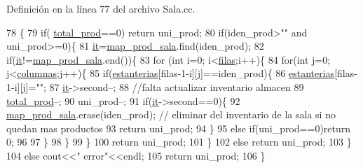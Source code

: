 Definición en la línea 77 del archivo Sala.\+cc.


\begin{DoxyCode}
78 \{
79     \textcolor{keywordflow}{if}( \hyperlink{class_sala_aeb64df257f47ad63fe1ba3b163255e14}{total\_prod}==0) \textcolor{keywordflow}{return} uni\_prod;
80     \textcolor{keywordflow}{if}(iden\_prod>\textcolor{stringliteral}{""} and uni\_prod>=0)\{
81         \hyperlink{class_sala_a1cc789ab041a9e3011f9eec9357e8fb0}{it}=\hyperlink{class_sala_a1ee09851cf1735dc48ab69a91952e250}{map\_prod\_sala}.find(iden\_prod);
82         \textcolor{keywordflow}{if}(\hyperlink{class_sala_a1cc789ab041a9e3011f9eec9357e8fb0}{it}!=\hyperlink{class_sala_a1ee09851cf1735dc48ab69a91952e250}{map\_prod\_sala}.end())\{
83             \textcolor{keywordflow}{for} (\textcolor{keywordtype}{int} i=0; i<\hyperlink{class_sala_a4cccb03763eea3ebd6d192491b25f7dc}{filas};i++)\{
84                 \textcolor{keywordflow}{for}(\textcolor{keywordtype}{int} j=0; j<\hyperlink{class_sala_af3c278931f26e28e77fa363e9be82000}{columnas};j++)\{
85                     \textcolor{keywordflow}{if}(\hyperlink{class_sala_a88aae17b7e590770fe8115b41da2e26a}{estanterias}[filas-1-i][j]==iden\_prod)\{
86                         \hyperlink{class_sala_a88aae17b7e590770fe8115b41da2e26a}{estanterias}[filas-1-i][j]=\textcolor{stringliteral}{""};
87                         \hyperlink{class_sala_a1cc789ab041a9e3011f9eec9357e8fb0}{it}->second--;
88                         \textcolor{comment}{//falta actualizar inventario almacen}
89                         \hyperlink{class_sala_aeb64df257f47ad63fe1ba3b163255e14}{total\_prod}--;
90                         uni\_prod--;
91                         \textcolor{keywordflow}{if}(\hyperlink{class_sala_a1cc789ab041a9e3011f9eec9357e8fb0}{it}->second==0)\{
92                             \hyperlink{class_sala_a1ee09851cf1735dc48ab69a91952e250}{map\_prod\_sala}.erase(iden\_prod);    \textcolor{comment}{// eliminar del inventario de
       la sala si no quedan mas productos}
93                             \textcolor{keywordflow}{return} uni\_prod;
94                         \}
95                         \textcolor{keywordflow}{else} \textcolor{keywordflow}{if}(uni\_prod==0)\textcolor{keywordflow}{return} 0;
96                         
97                     \}
98                 \}
99             \}
100             \textcolor{keywordflow}{return} uni\_prod;
101         \}
102         \textcolor{keywordflow}{else} \textcolor{keywordflow}{return} uni\_prod;
103    \}
104    \textcolor{keywordflow}{else} cout<<\textcolor{stringliteral}{"  error"}<<endl;
105    \textcolor{keywordflow}{return} uni\_prod;
106 \}
\end{DoxyCode}
\mbox{\label{class_sala_aaac8d848595b493ea08516f2101b829e}} 
